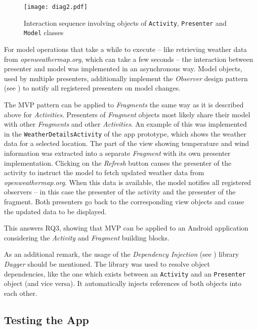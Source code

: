 \begin{figure}[h]
\centering
\texttt{[image: diag2.pdf]}
\caption{Interaction sequence involving objects of \texttt{Activity}, \texttt{Presenter} and \texttt{Model} classes}
\label{fig:androidmvpseq}
\end{figure}

For model operations that take a while to execute -- like retrieving weather data from \emph{openweathermap.org}, which can take a few seconds -- the interaction between presenter and model was implemented in an asynchronous way. Model objects, used by multiple presenters, additionally implement the \emph{Observer} design pattern (see \cite[p. 287]{GangOfFour}) to notify all registered presenters on model changes.

The MVP pattern can be applied to \emph{Fragments} the same way as it is described above for \emph{Activities}. Presenters of \emph{Fragment} objects most likely share their model with other \emph{Fragments} and other \emph{Activities}. An example of this was implemented in the \texttt{WeatherDetailsActivity} of the app prototype, which shows the weather data for a selected location. The part of the view showing temperature and wind information was extracted into a separate \emph{Fragment} with its own presenter implementation. Clicking on the \emph{Refresh} button causes the presenter of the activity to instruct the model to fetch updated weather data from \emph{openweathermap.org}. When this data is available, the model notifies all registered observers -- in this case the presenter of the activity and the presenter of the fragment. Both presenters go back to the corresponding view objects and cause the updated data to be displayed.


This answers RQ3, showing that MVP can be applied to an Android application considering the \emph{Activity} and \emph{Fragment} building blocks.

As an additional remark, the usage of the \emph{Dependency Injection} (see \cite{FowlerIoC}) library \emph{Dagger} should be mentioned. The library was used to resolve object dependencies, like the one which exists between an \texttt{Activity} and an \texttt{Presenter} object (and vice versa). It automatically injects references of both objects into each other.

\subsection{Testing the App}

